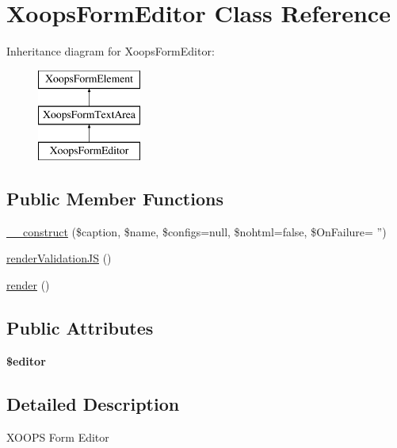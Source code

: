 \hypertarget{class_xoops_form_editor}{\section{Xoops\-Form\-Editor Class Reference}
\label{class_xoops_form_editor}
}
Inheritance diagram for Xoops\-Form\-Editor\-:\begin{figure}[H]
\begin{center}
\leavevmode
\includegraphics[height=3.000000cm]{class_xoops_form_editor}
\end{center}
\end{figure}
\subsection*{Public Member Functions}
\begin{DoxyCompactItemize}
\item 
\hyperlink{class_xoops_form_editor_a2926d1063d7a54e12527fe445a256f7a}{\-\_\-\-\_\-construct} (\$caption, \$name, \$configs=null, \$nohtml=false, \$On\-Failure= '')
\item 
\hyperlink{class_xoops_form_editor_aa9a3adab3303e296b3419ce97826a6df}{render\-Validation\-J\-S} ()
\item 
\hyperlink{class_xoops_form_editor_a048c2cecbed94fd8d02f9fb8ee5258b1}{render} ()
\end{DoxyCompactItemize}
\subsection*{Public Attributes}
\begin{DoxyCompactItemize}
\item 
\hypertarget{class_xoops_form_editor_afc4927e0456d0459b80aab1ccb9c8e83}{{\bfseries \$editor}}\label{class_xoops_form_editor_afc4927e0456d0459b80aab1ccb9c8e83}

\end{DoxyCompactItemize}


\subsection{Detailed Description}
X\-O\-O\-P\-S Form Editor 

